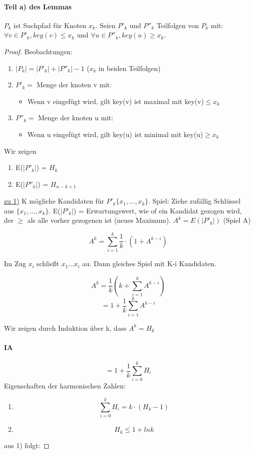 \documentclass[ngerman]{scrartcl}
\begin{document}
\paragraph{Teil a) des Lemmas} $P_k $ ist Suchpfad für Knoten $x_k $. Seien $ P'_k $ und $ P''_k $ Teilfolgen von $ P_k $ mit: $ \forall v \in P'_k, key(v)\leq x_k $ und $ \forall u \in P''_k, key(u)\geq x_k $. 
\begin{proof}
Beobachtungen:
\begin{enumerate}
    \item $ |P_k| = |P'_k| + |P''_k| - 1 $ ($ x_k $ in beiden Teilfolgen)
    \item $ P'_k = $ Menge der knoten v mit:
    \begin{itemize}
        \item Wenn v eingefügt wird, gilt key(v) ist maximal mit key(v)$ \leq x_k $
    \end{itemize}
    \item $ P''_k = $ Menge der knoten u mit:
    \begin{itemize}
        \item Wenn u eingefügt wird, gilt key(u) ist minimal mit key(u)$ \geq x_k $
    \end{itemize}
\end{enumerate}
Wir zeigen
\begin{enumerate}
    \item E($ |P'_k| $) = $ H_k $
    \item E($ |P''_k| $) = $ H_{n-k+1} $
\end{enumerate}
\underline{zu 1)} K mögliche Kandidaten für $ P'_k \{x_1,...,x_k\}$. Spiel: Ziehe zufällig Schlüssel aus $\{x_1,...,x_k\}$. E($ |P'_k| $) = Erwartungswert, wie of ein Kandidat gezogen wird, der $ \geq $ als alle vorher gezogenen ist (neues Maximum). $ A^k = E(|P'_k|)$ (Spiel A)

$$A^k = \sum_{i=1}^k \frac{1}{k} \cdot (1 + A^{k-i})$$

Im Zug $ x_i $ schließt $ x_1 ... x_i $ au. Dann gleiches Spiel mit K-i Kandidaten.

$$A^k = \frac{1}{k} (k + \sum^{k}_{i=1} A^{k-i}) $$
$$ = 1 + \frac{1}{k} \sum^{k}_{i=1} A^{k-i}$$ 

Wir zeigen durch Induktion über k, dass $ A^k = H_k $

\paragraph{IA}
$$ = 1 + \frac{1}{k} \sum^{k}_{i=0} H_i$$ 
Eigenschaften der harmonischen Zahlen:
\begin{enumerate}
    \item $$ \sum^{k}_{i=0} H_i = k \cdot (H_k -1 )$$
    \item $$ H_k \leq 1 + lnk$$ 
\end{enumerate}
aus 1) folgt: 


\end{proof}
\end{document}

